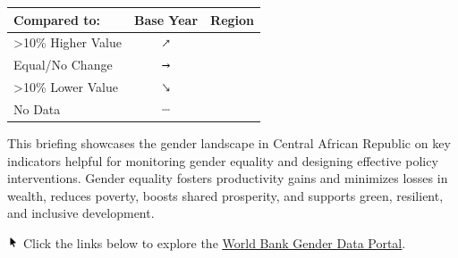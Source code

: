 \documentclass[
]{article}
\author{}
\date{\vspace{-2.5em}}
\begin{document}

\begin{table}\begingroup\fontsize{8}{10}\selectfont

\begin{tabular}[t]{lcl}

\textbf{Compared to:} & \textbf{Base Year} & \textbf{Region}\\
\midrule
>10\% Higher Value & \includegraphics[width=0.1in, height=0.1in]{upicon.png} & \cellcolor[HTML]{21908C}{}\\
Equal/No Change & \includegraphics[width=0.1in, height=0.1in]{righticon.png} & \cellcolor[HTML]{34608D}{}\\
>10\% Lower Value & \includegraphics[width=0.1in, height=0.1in]{downicon.png} & \cellcolor[HTML]{482576}{}\\
No Data & \includegraphics[width=0.1in, height=0.1in]{naicon.png} & \cellcolor{gray}{}\\

\end{tabular}
\endgroup{}\end{table}
\begin{minipage}[t][1.7cm][t]{12cm}
\fontsize{9}{8}\selectfont\raggedright
This briefing showcases the gender landscape in Central African Republic on key indicators helpful for monitoring gender equality and designing effective policy interventions. Gender equality fosters productivity gains and minimizes losses in wealth, reduces poverty, boosts shared prosperity, and supports green, resilient, and inclusive development. 

\includegraphics[width=10pt]{pointer.png} Click the links below to explore the \underline{\href{https://genderdata.worldbank.org/}{World Bank Gender Data Portal}}.
\end{minipage}
\vspace{8pt}
\end{document}
